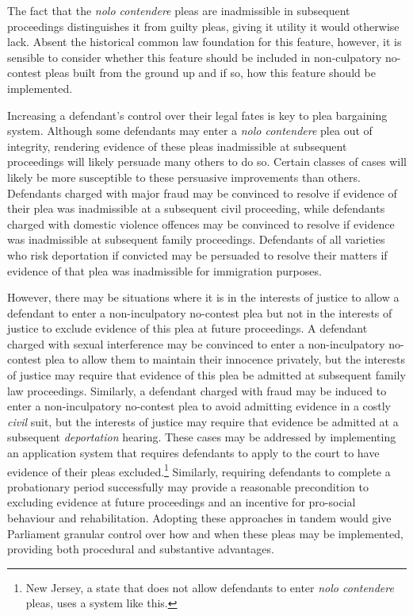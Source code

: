 The fact that the \textit{nolo contendere} pleas are inadmissible in subsequent proceedings distinguishes it from guilty pleas, giving it utility it would otherwise lack. Absent the historical common law foundation for this feature, however, it is sensible to consider whether this feature should be included in non-culpatory no-contest pleas built from the ground up and if so, how this feature should be implemented. 

Increasing a defendant's control over their legal fates is key to plea bargaining system. Although some defendants may enter a \textit{nolo contendere} plea out of integrity, rendering evidence of these pleas inadmissible at subsequent proceedings will likely persuade many others to do so. Certain classes of cases will likely be more susceptible to these persuasive improvements than others. Defendants charged with major fraud may be convinced to resolve if evidence of their plea was inadmissible at a subsequent civil proceeding, while defendants charged with domestic violence offences may be convinced to resolve if evidence was inadmissible at subsequent family proceedings. Defendants of all varieties who risk deportation if convicted may be persuaded to resolve their matters if evidence of that plea was inadmissible for immigration purposes.

However, there may be situations where it is in the interests of justice to allow a defendant to enter a non-inculpatory no-contest plea but not in the interests of justice to exclude evidence of this plea at future proceedings. A defendant charged with sexual interference may be convinced to enter a non-inculpatory no-contest plea to allow them to maintain their innocence privately, but the interests of justice may require that evidence of this plea be admitted at subsequent family law proceedings. Similarly, a defendant charged with fraud may be induced to enter a non-inculpatory no-contest plea to avoid admitting evidence in a costly \textit{civil} suit, but the interests of justice may require that evidence be admitted at a subsequent \textit{deportation} hearing. These cases may be addressed by implementing an application system that requires defendants to apply to the court to have evidence of their pleas excluded.\footnote{New Jersey, a state that does not allow defendants to enter \textit{nolo contendere} pleas, uses a system like this.} Similarly, requiring defendants to complete a probationary period successfully may provide a reasonable precondition to excluding evidence at future proceedings and an incentive for pro-social behaviour and rehabilitation. Adopting these approaches in tandem would give Parliament granular control over how and when these pleas may be implemented, providing both procedural and substantive advantages.